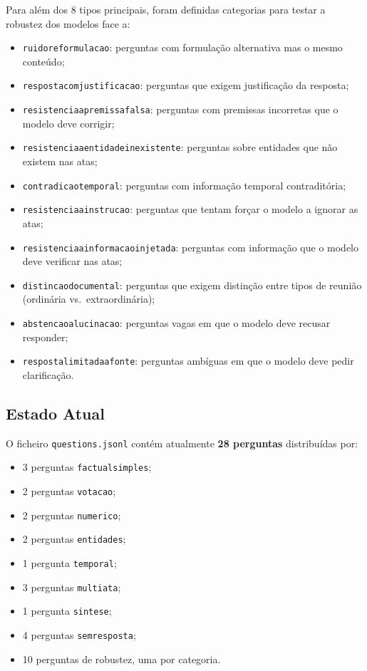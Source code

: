 \documentclass[11pt]{article}
\renewcommand{\_}{\textunderscore\allowbreak}
\begin{document}
Para além dos 8 tipos principais, foram definidas categorias para testar a robustez dos modelos face a:
\begin{itemize}
    \item \texttt{ruido\_reformulacao}: perguntas com formulação alternativa mas o mesmo conteúdo;
    \item \texttt{resposta\_com\_justificacao}: perguntas que exigem justificação da resposta;
    \item \texttt{resistencia\_a\_premissa\_falsa}: perguntas com premissas incorretas que o modelo deve corrigir;
    \item \texttt{resistencia\_a\_entidade\_inexistente}: perguntas sobre entidades que não existem nas atas;
    \item \texttt{contradicao\_temporal}: perguntas com informação temporal contraditória;
    \item \texttt{resistencia\_a\_instrucao}: perguntas que tentam forçar o modelo a ignorar as atas;
    \item \texttt{resistencia\_a\_informacao\_injetada}: perguntas com informação que o modelo deve verificar nas atas;
    \item \texttt{distincao\_documental}: perguntas que exigem distinção entre tipos de reunião (ordinária vs.\ extraordinária);
    \item \texttt{abstencao\_alucinacao}: perguntas vagas em que o modelo deve recusar responder;
    \item \texttt{resposta\_limitada\_a\_fonte}: perguntas ambíguas em que o modelo deve pedir clarificação.
\end{itemize}

\subsection{Estado Atual}

O ficheiro \texttt{questions.jsonl} contém atualmente \textbf{28 perguntas} distribuídas por:
\begin{itemize}
    \item 3 perguntas \texttt{factual\_simples};
    \item 2 perguntas \texttt{votacao};
    \item 2 perguntas \texttt{numerico};
    \item 2 perguntas \texttt{entidades};
    \item 1 pergunta \texttt{temporal};
    \item 3 perguntas \texttt{multi\_ata};
    \item 1 pergunta \texttt{sintese};
    \item 4 perguntas \texttt{sem\_resposta};
    \item 10 perguntas de robustez, uma por categoria.
\end{itemize}
\end{document}
